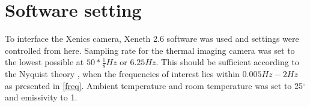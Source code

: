 \section{Software setting}

To interface the Xenics camera, Xeneth 2.6 software was used and settings were controlled from here.   
Sampling rate for the thermal imaging camera was set to the lowest possible at $50*\frac{1}{8} Hz$ or $6.25 Hz$. This should be sufficient according to the Nyquist theory \cite{weik2001}, when the frequencies of interest lies within $0.005 Hz-2 Hz$ as presented in \cref{freq}. Ambient temperature and room temperature was set to 25$^{\circ}$ and emissivity to 1.



